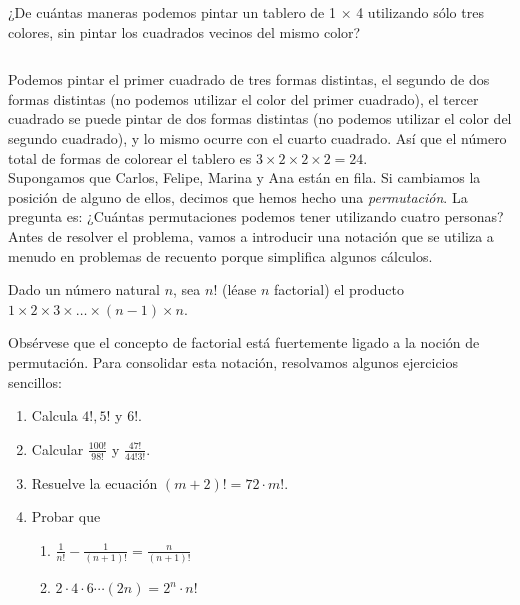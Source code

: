 \documentclass[11pt]{scrartcl}
\begin{document}
\begin{example}
¿De cuántas maneras podemos pintar un tablero de 1 × 4 utilizando sólo tres colores, sin pintar los cuadrados vecinos del mismo color?\\
\begin{tabular}{|c|c|c|c|}
\hline
 & & & \\
\hline
\end{tabular}
\end{example}

Podemos pintar el primer cuadrado de tres formas distintas, el segundo de dos formas distintas (no podemos utilizar el color del primer cuadrado), el tercer cuadrado se puede pintar de dos formas distintas (no podemos utilizar el color del segundo cuadrado), y lo mismo ocurre con el cuarto cuadrado. Así que el número total de formas de colorear el tablero es $3 \times 2 \times 2 \times 2 = 24$.\\

Supongamos que Carlos, Felipe, Marina y Ana están en fila. Si cambiamos la posición de alguno de ellos, decimos que hemos hecho una \textit{permutación}. La pregunta es: ¿Cuántas permutaciones podemos tener utilizando cuatro personas? Antes de resolver el problema, vamos a introducir una notación que se utiliza a menudo en problemas de recuento porque simplifica algunos cálculos.

\begin{claim}
    Dado un número natural \( n \), sea \( n! \) (léase \( n \) factorial) el producto \( 1 \times 2 \times 3 \times \ldots \times (n-1) \times n \).
\end{claim}

Obsérvese que el concepto de factorial está fuertemente ligado a la noción de permutación. Para consolidar esta notación, resolvamos algunos ejercicios sencillos:
\begin{enumerate}
    \item Calcula \(4!, 5!\) y \(6!\).
    \item Calcular \(\displaystyle\frac{100!}{98!}\) y \(\displaystyle\frac{47!}{44!3!}\).
    \item Resuelve la ecuación \((m + 2)! = 72 \cdot m!\).
    \item Probar que \begin{enumerate}
        \item \(\displaystyle \frac{1}{n!}-\frac{1}{(n+1)!}=\frac{n}{(n+1)!}\)
        \item \(2\cdot 4\cdot 6\cdots (2n)=2^n\cdot n!\)
    \end{enumerate}
\end{enumerate}
\end{document}
